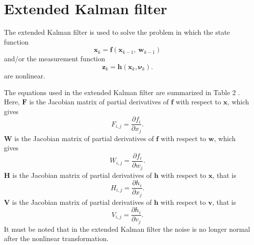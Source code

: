 \documentclass[12pt]{article}
\begin{document}

\section{Extended Kalman filter}\label{extended-kalman-filter}

The extended Kalman filter is used to solve the problem in which the state function
%
\begin{equation}
	\mathbf{x}_{k} = \mathbf{f}( \mathbf{x}_{k - 1},\ \mathbf{w}_{k - 1})
\end{equation}
and/or the measurement function
%
\begin{equation}
	\mathbf{z}_{k} = \mathbf{h}( \mathbf{x}_{k},\mathbf{\nu}_{k}).
\end{equation}
%
are nonlinear.

The equations used in the extended Kalman filter are summarized in Table 2 \cite{Welch}. Here, \(\mathbf{F}\) is the Jacobian matrix of partial derivatives of \(\mathbf{f}\) with respect to \(\mathbf{x}\), which gives
%
\begin{equation}
	F_{i,j} = \frac{\partial f_{i}}{\partial x_{j}}.
\end{equation}
%
\(\mathbf{W}\) is the Jacobian matrix of partial derivatives of \(\mathbf{f}\) with respect to \(\mathbf{w}\), which gives
%
\begin{equation}
	W_{i,j} = \frac{\partial f_{i}}{\partial w_{j}}.
\end{equation}
%
\(\mathbf{H}\) is the Jacobian matrix of partial derivatives of \(\mathbf{h}\) with respect to \(\mathbf{x}\), that is
%
\begin{equation}
	H_{i,j} = \frac{\partial h_{i}}{\partial x_{j}}.
\end{equation}
%
\(\mathbf{V}\) is the Jacobian matrix of partial derivatives of \(\mathbf{h}\) with respect to \(\mathbf{v}\), that is
%
\begin{equation}
	V_{i,j} = \frac{\partial h_{i}}{\partial v_{j}}.
\end{equation}
%
It must be noted that in the extended Kalman filter the noise is no
longer normal after the nonlinear transformation.
\end{document}

